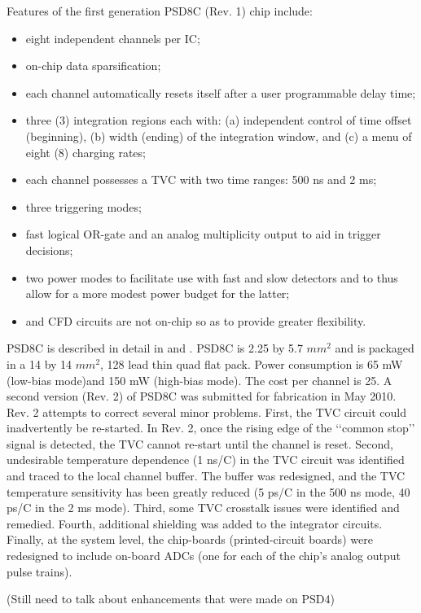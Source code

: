\documentclass[12pt,oneside,final]{siuethesis}
\theoremstyle{definition}
\begin{document}
Features of the first generation PSD8C (Rev. 1) chip include:
\begin{itemize}
\item
eight independent channels per IC;
\item
on-chip data sparsification;
\item
each channel automatically resets itself after a user programmable delay time;
\item
three (3) integration regions each with: (a) independent
control of time offset (beginning), (b) width (ending) of the
integration window, and (c) a menu of eight (8) charging rates;
\item
each channel possesses a TVC with two time ranges: 500 ns and 2 ms;
\item
three triggering modes;
\item
fast logical OR-gate and an analog multiplicity output to aid in
trigger decisions;
\item
two power modes to facilitate use with fast and slow detectors
and to thus allow for a more modest power budget for the
latter; 
\item
and CFD circuits are not on-chip so as to provide greater flexibility.
\end{itemize}

PSD8C is described in detail in \cite{PROCTOR} and \cite{HALL}. PSD8C is 2.25 by 5.7 $mm^2$ and is packaged in a 14 by 14 $mm^2$, 128 lead thin quad flat pack. Power consumption is 65 mW (low-bias mode)and 150 mW (high-bias mode). The cost per channel is 25.
A second version (Rev. 2) of PSD8C was submitted for fabrication in May 2010. Rev. 2 attempts to correct several minor
problems. First, the TVC circuit could inadvertently be re-started. In Rev. 2, once the rising edge of the ‘‘common stop’’ signal is detected, the TVC cannot re-start until the channel is reset. Second, undesirable temperature dependence (1 ns/C) in the TVC circuit was identified and traced to the local channel buffer. The buffer was redesigned, and the TVC temperature sensitivity has been greatly reduced (5 ps/C in the 500 ns mode, 40 ps/C in the 2 ms mode). Third, some TVC crosstalk issues were identified and remedied. Fourth, additional shielding was added to the integrator circuits. Finally, at the system level, the chip-boards (printed-circuit boards) were redesigned to include on-board ADCs (one for each of the chip’s analog output pulse trains).

(Still need to talk about enhancements that were made on PSD4)
\end{document}
